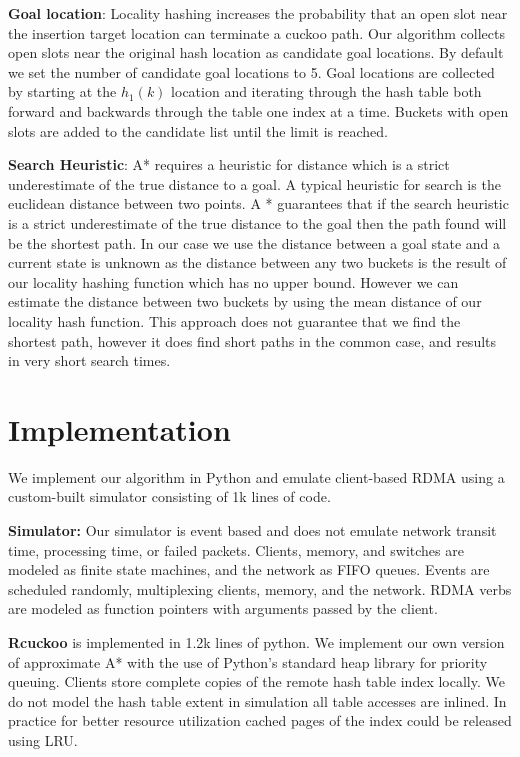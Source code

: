\textbf{Goal location}: Locality hashing increases the
probability that an open slot near the insertion target
location can terminate a cuckoo path. Our algorithm collects
open slots near the original hash location as candidate goal
locations. By default we set the number of candidate goal
locations to 5. Goal locations are collected by starting at
the $h_1(k)$ location and iterating through the hash
table both forward and backwards through the table one index
at a time. Buckets with open slots are added to the
candidate list until the limit is reached. 


\textbf{Search Heuristic}: A* requires a heuristic for
distance which is a strict underestimate of the true
distance to a goal. A typical heuristic for search is the
euclidean distance between two points. A * guarantees that
if the search heuristic is a strict underestimate of the
true distance to the goal then the path found will be the
shortest path. In our case we use the distance between a
goal state and a current state is unknown as the distance
between any two buckets is the result of our locality
hashing function which has no upper bound. However we can
estimate the distance between two buckets by using the mean
distance of our locality hash function. This approach does
not guarantee that we find the shortest path, however it
does find short paths in the common case, and results in
very short search times.

\section{Implementation}

We implement our algorithm in
Python and emulate client-based RDMA using a custom-built
simulator consisting of 1k lines of code. 

\textbf{Simulator:} Our simulator is event based and does
not emulate network transit time, processing time, or failed
packets. Clients, memory, and switches are modeled as finite
state machines, and the network as FIFO queues. Events are
scheduled randomly, multiplexing clients, memory, and the
network. RDMA verbs are modeled as function pointers with
arguments passed by the client.

\textbf{Rcuckoo} is implemented in 1.2k lines of
python. We implement our own version of approximate A* with
the use of Python's standard heap library for priority
queuing. Clients store complete copies of the remote hash
table index locally. We do not model the hash table extent
in simulation all table accesses are inlined. In practice
for better resource utilization cached pages of the index
could be released using LRU. 

